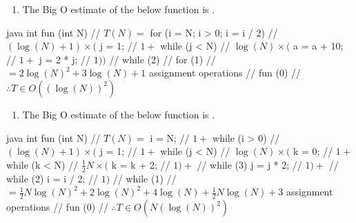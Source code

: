 \documentclass[12pt, a4paper]{article}
\begin{document}
\begin{enumerate}
		\begin{enumerate}[resume]
		\item The Big O estimate of the below function is .
		\end{enumerate}\begin{mymintedunbreakablecodeblock}{java}
			int fun (int N) {                   // $T(N) =$
			  for (i = N; i > 0; i = i / 2) {   // $(\log(N) + 1) \times ($
			    j = 1;                          // $1 +$
			    while (j < N) {                 // $\log(N) \times ($
			      a = a + 10;                   // $1 +$
			      j = 2 * j;                    // $1))$
			    } // while (2)
			  } // for (1)
			    // $= 2\log(N)^2 + 3\log(N) + 1$ assignment operations
			} // fun (0)
			  // $\therefore T \in O((\log(N))^2)$\end{mymintedunbreakablecodeblock}
			\label{3(c)} %

		\begin{enumerate}[resume]
		\item The Big O estimate of the below function is .
		\end{enumerate}\begin{mymintedunbreakablecodeblock}{java}
			int fun (int N) {                   // $T(N) =$
			  i = N;                            // $1 +$
			  while (i > 0) {                   // $(\log(N) + 1) \times ($
			    j = 1;                          // $1 +$
			    while (j < N) {                 // $\log(N) \times ($
			      k = 0;                        // $1 +$
			      while (k < N) {               // $\frac{1}{2}N \times ($
			        k = k + 2;                  // $1) +$
			      } // while (3)
			      j = j * 2;                    // $1) +$
			    } // while (2)
			    i = i / 2;                      // $1)$
			  } // while (1)
			    // $= \frac{1}{2}N\log(N)^2 + 2\log(N)^2 + 4\log(N) + \frac{1}{2}N\log(N) + 3$ assignment operations
			} // fun (0)
			  // $\therefore T \in O(N(\log(N))^2)$\end{mymintedunbreakablecodeblock}
			\label{3(d)} %
		
\end{enumerate}
\end{document}
